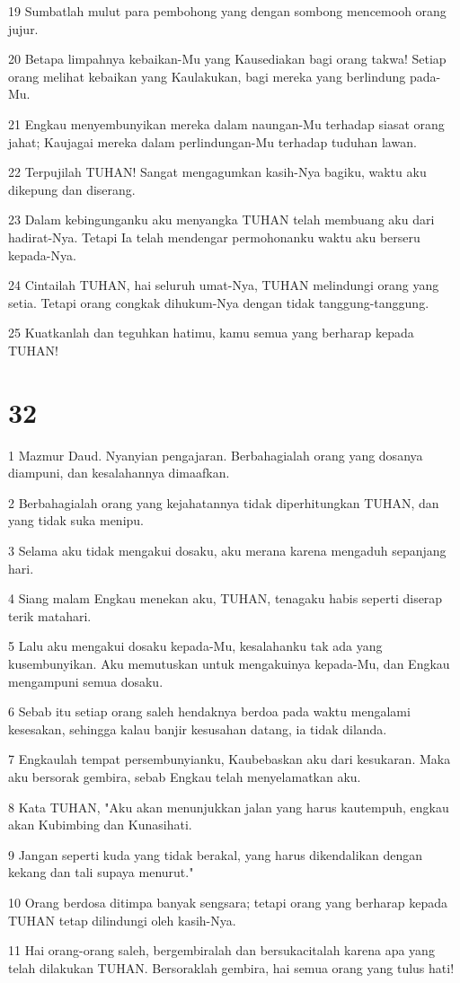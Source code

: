 \par 19 Sumbatlah mulut para pembohong yang dengan sombong mencemooh orang jujur.
\par 20 Betapa limpahnya kebaikan-Mu yang Kausediakan bagi orang takwa! Setiap orang melihat kebaikan yang Kaulakukan, bagi mereka yang berlindung pada-Mu.
\par 21 Engkau menyembunyikan mereka dalam naungan-Mu terhadap siasat orang jahat; Kaujagai mereka dalam perlindungan-Mu terhadap tuduhan lawan.
\par 22 Terpujilah TUHAN! Sangat mengagumkan kasih-Nya bagiku, waktu aku dikepung dan diserang.
\par 23 Dalam kebingunganku aku menyangka TUHAN telah membuang aku dari hadirat-Nya. Tetapi Ia telah mendengar permohonanku waktu aku berseru kepada-Nya.
\par 24 Cintailah TUHAN, hai seluruh umat-Nya, TUHAN melindungi orang yang setia. Tetapi orang congkak dihukum-Nya dengan tidak tanggung-tanggung.
\par 25 Kuatkanlah dan teguhkan hatimu, kamu semua yang berharap kepada TUHAN!

\chapter{32}

\par 1 Mazmur Daud. Nyanyian pengajaran. Berbahagialah orang yang dosanya diampuni, dan kesalahannya dimaafkan.
\par 2 Berbahagialah orang yang kejahatannya tidak diperhitungkan TUHAN, dan yang tidak suka menipu.
\par 3 Selama aku tidak mengakui dosaku, aku merana karena mengaduh sepanjang hari.
\par 4 Siang malam Engkau menekan aku, TUHAN, tenagaku habis seperti diserap terik matahari.
\par 5 Lalu aku mengakui dosaku kepada-Mu, kesalahanku tak ada yang kusembunyikan. Aku memutuskan untuk mengakuinya kepada-Mu, dan Engkau mengampuni semua dosaku.
\par 6 Sebab itu setiap orang saleh hendaknya berdoa pada waktu mengalami kesesakan, sehingga kalau banjir kesusahan datang, ia tidak dilanda.
\par 7 Engkaulah tempat persembunyianku, Kaubebaskan aku dari kesukaran. Maka aku bersorak gembira, sebab Engkau telah menyelamatkan aku.
\par 8 Kata TUHAN, "Aku akan menunjukkan jalan yang harus kautempuh, engkau akan Kubimbing dan Kunasihati.
\par 9 Jangan seperti kuda yang tidak berakal, yang harus dikendalikan dengan kekang dan tali supaya menurut."
\par 10 Orang berdosa ditimpa banyak sengsara; tetapi orang yang berharap kepada TUHAN tetap dilindungi oleh kasih-Nya.
\par 11 Hai orang-orang saleh, bergembiralah dan bersukacitalah karena apa yang telah dilakukan TUHAN. Bersoraklah gembira, hai semua orang yang tulus hati!

